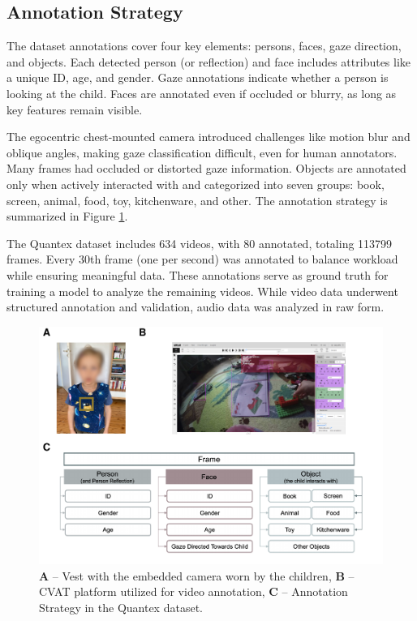 \documentclass[
  man,floatsintext]{apa6}
\begin{document}
\subsection{Annotation Strategy}\label{annotation-strategy}

The dataset annotations cover four key elements: persons, faces, gaze direction, and objects. Each detected person (or reflection) and face includes attributes like a unique ID, age, and gender. Gaze annotations indicate whether a person is looking at the child. Faces are annotated even if occluded or blurry, as long as key features remain visible.

The egocentric chest-mounted camera introduced challenges like motion blur and oblique angles, making gaze classification difficult, even for human annotators. Many frames had occluded or distorted gaze information. Objects are annotated only when actively interacted with and categorized into seven groups: book, screen, animal, food, toy, kitchenware, and other. The annotation strategy is summarized in Figure \ref{fig:camera-cvat-activity-classes}.

The Quantex dataset includes 634 videos, with 80 annotated, totaling 113799 frames. Every 30th frame (one per second) was annotated to balance workload while ensuring meaningful data. These annotations serve as ground truth for training a model to analyze the remaining videos. While video data underwent structured annotation and validation, audio data was analyzed in raw form.

\begin{figure}

{\centering \includegraphics{Quantex_interaction_paper_files/figure-latex/camera-cvat-activity-classes-1} 

}

\caption{\textbf{A} – Vest with the embedded camera worn by the children, \textbf{B} – CVAT platform utilized for video annotation, \textbf{C} – Annotation Strategy in the Quantex dataset.}\label{fig:camera-cvat-activity-classes}
\end{figure}
\end{document}
